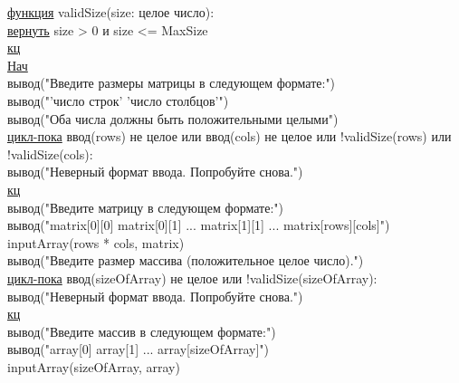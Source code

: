 \noindent \underline{функция} validSize(size: целое число):\\
\null\qquad \underline{вернуть} size > 0 и size <= MaxSize\\
\underline{кц}\\

\noindent \underline{Нач}\\
\null\qquad вывод("Введите размеры матрицы в следующем формате:")\\
\null\qquad вывод("'число строк' 'число столбцов'")\\
\null\qquad вывод("Оба числа должны быть положительными целыми")\\

\noindent
\null\qquad \underline{цикл-пока} ввод(rows) не целое или ввод(cols) не целое или !validSize(rows) или !validSize(cols):\\
\null\qquad \qquad вывод("Неверный формат ввода. Попробуйте снова.")\\
\null\qquad \underline{кц}\\

\noindent
\null\qquad вывод("Введите матрицу в следующем формате:")\\
\null\qquad вывод("matrix[0][0] matrix[0][1] ... matrix[1][1] ... matrix[rows][cols]")\\
\null\qquad inputArray(rows * cols, matrix)\\

\noindent
\null\qquad вывод("Введите размер массива (положительное целое число).")\\

\noindent
\null\qquad \underline{цикл-пока} ввод(sizeOfArray) не целое или !validSize(sizeOfArray):\\
\null\qquad \qquad вывод("Неверный формат ввода. Попробуйте снова.")\\
\null\qquad \underline{кц}\\

\noindent
\null\qquad вывод("Введите массив в следующем формате:")\\
\null\qquad вывод("array[0] array[1] ... array[sizeOfArray]")\\
\null\qquad inputArray(sizeOfArray, array)\\


